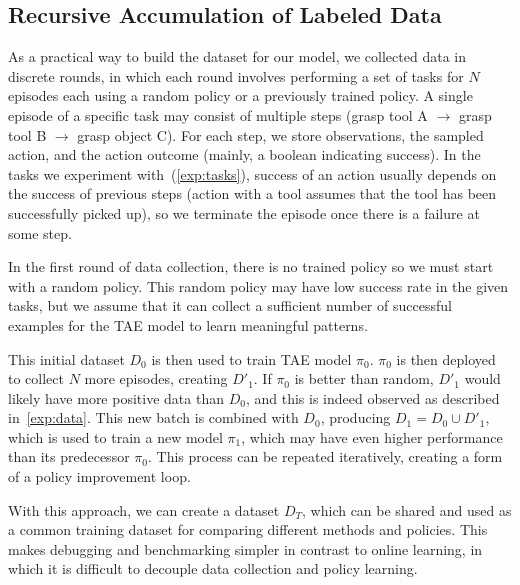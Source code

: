 \documentclass[10pt,twocolumn,letterpaper]{article}
\begin{document}
\subsection{Recursive Accumulation of Labeled Data}
\label{method_data}

As a practical way to build the dataset for our model, we collected data in discrete rounds, in which each round involves performing a set of tasks for $N$ episodes each using a random policy or a previously trained policy. A single episode of a specific task may consist of multiple steps (\eg grasp tool A $\rightarrow$ grasp tool B $\rightarrow$ grasp object C). For each step, we store observations, the sampled action, and the action outcome (mainly, a boolean indicating success). In the tasks we experiment with~(\cref{exp:tasks}), success of an action usually depends on the success of previous steps (\eg action with a tool assumes that the tool has been successfully picked up), so we terminate the episode once there is a failure at some step.

In the first round of data collection, there is no trained policy so we must start with a random policy. This random policy may have low success rate in the given tasks, but we assume that it can collect a sufficient number of successful examples for the TAE model to learn meaningful patterns.

This initial dataset $D_0$ is then used to train TAE model $\pi_0$. $\pi_0$ is then deployed to collect $N$ more episodes, creating ${D'}_1$. If $\pi_0$ is better than random, ${D'}_1$ would likely have more positive data than $D_0$, and this is indeed observed as described in~\cref{exp:data}. This new batch is combined with $D_0$, producing $D_1 = D_0 \cup {D'}_1$, which is used to train a new model $\pi_1$, which may have even higher performance than its predecessor $\pi_0$. This process can be repeated iteratively, creating a form of a policy improvement loop.

With this approach, we can create a dataset $D_T$, which can be shared and used as a common training dataset for comparing different methods and policies. This makes debugging and benchmarking simpler in contrast to online learning, in which it is difficult to decouple data collection and policy learning.

\end{document}
